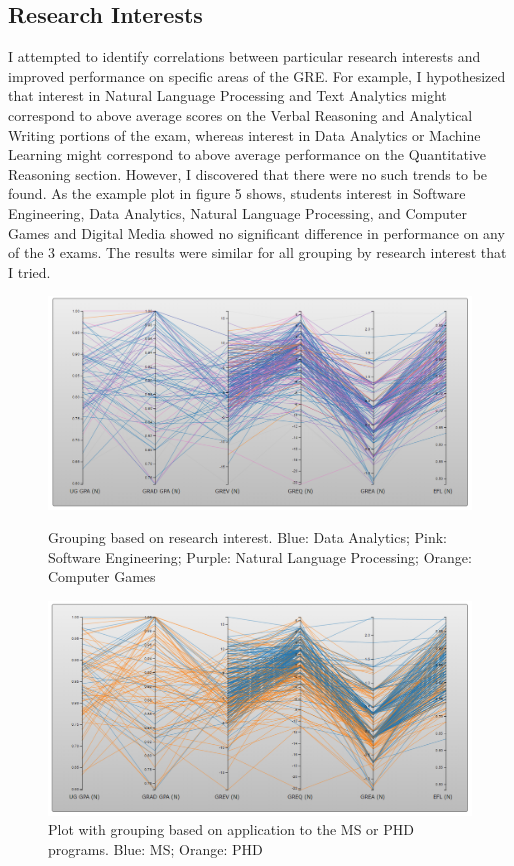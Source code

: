 \documentclass[]{article}
\begin{document}
	\subsection {Research Interests}
		I attempted to identify correlations between particular research interests and improved performance on specific areas of the GRE. For example, I hypothesized that interest in Natural Language Processing and Text Analytics might correspond to above average scores on the Verbal Reasoning and Analytical Writing portions of the exam, whereas interest in Data Analytics or Machine Learning might correspond to above average performance on the Quantitative Reasoning section. However, I discovered that there were no such trends to be found. As the example plot in figure 5 shows, students interest in Software Engineering, Data Analytics, Natural Language Processing, and Computer Games and Digital Media showed no significant difference in performance on any of the 3 exams. The results were similar for all grouping by research interest that I tried.
		\begin{figure}[h!]
			\includegraphics[width=\linewidth]{RI.png}
			\caption{Grouping based on research interest. Blue: Data Analytics; Pink: Software Engineering; Purple: Natural Language Processing; Orange: Computer Games}
			\label{fig:RI}
			\includegraphics[width=\linewidth]{ms_phd.png}
			\caption{Plot with grouping based on application to the MS or PHD programs. Blue: MS; Orange: PHD}
			\label{fig:MS_PHD}
		\end{figure}
\end{document}
